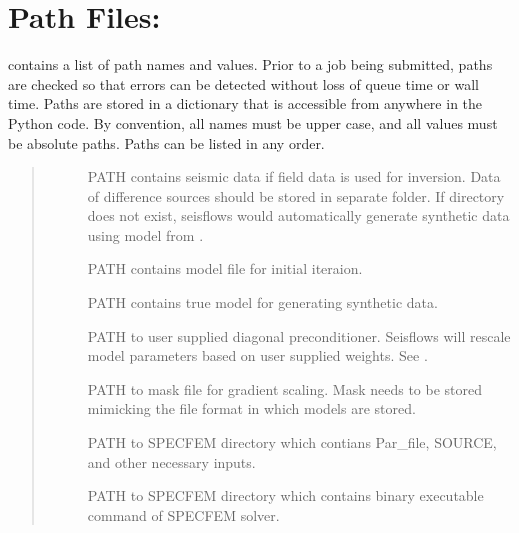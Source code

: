 \documentclass[letterpaper,10pt,english]{sphinxmanual}
\begin{document}
\section{Path Files: }
\label{\detokenize{main/design_project:path-files-paths-py}}\label{\detokenize{main/design_project:path}}
 contains a list of path names and values. Prior to a job being submitted, paths are checked so that errors can be detected without loss of queue time or wall time. Paths are stored in a dictionary that is accessible from anywhere in the Python code. By convention, all names must be upper case, and all values must be absolute paths. Paths can be listed in any order.
\begin{quote}\begin{description}
\item[{}] \leavevmode
PATH contains seismic data if field data is used for inversion. Data of difference sources should be stored in separate folder. If  directory does not exist, seisflows would automatically generate synthetic data using model from .

\item[{}] \leavevmode
PATH contains model file for initial iteraion.

\item[{}] \leavevmode
PATH contains true model for generating synthetic data.

\item[{}] \leavevmode
PATH to user supplied diagonal preconditioner. Seisflows will rescale model parameters based on user supplied weights. See {\hyperref[\detokenize{ref/seisflows.plugins.preconds:sfprecond}]{}}.

\item[{}] \leavevmode
PATH to mask file for gradient scaling. Mask needs to be stored mimicking the file format in which models are stored.

\item[{}] \leavevmode
PATH to SPECFEM  directory which contians Par\_file, SOURCE, and other necessary inputs.

\item[{}] \leavevmode
PATH to SPECFEM  directory which contains binary executable command of SPECFEM solver.

\end{description}\end{quote}
\end{document}
